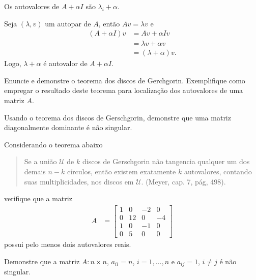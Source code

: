 \begin{questions}
    \question Os autovalores de $A + \alpha I$ s\~{a}o $\lambda_i + \alpha$.
    \begin{solution}
        Seja $(\lambda, v)$ um autopar de $A$, ent\~{a}o $A v = \lambda v$ e
        \begin{align*}
            (A + \alpha I) v &= A v + \alpha I v \\
            &= \lambda v + \alpha v \\
            &= (\lambda + \alpha)v.
        \end{align*}
        Logo, $\lambda + \alpha$ \'{e} autovalor de $A + \alpha I$.
    \end{solution}

    \question Enuncie e demonstre o teorema dos discos de Gerchgorin. Exemplifique como empregar o resultado deste teorema para localiza\c{c}\~{a}o dos autovalores de uma matriz $A$.
    \begin{solution}
    \end{solution}

    \question Usando o teorema dos discos de Gerschgorin, demonstre que uma matriz diagonalmente dominante \'{e} n\~{a}o singular.
    \begin{solution}
    \end{solution}

    \question Considerando o teorema abaixo
    \begin{quote}
        Se a uni\~{a}o $\mathcal{U}$ de $k$ discos de Gerschgorin n\~{a}o tangencia qualquer um dos demais $n - k$ c\'{i}rculos, ent\~{a}o existem exatamente $k$ autovalores, contando suas multiplicidades, nos discos em $\mathcal{U}$. (Meyer\nocite{Meyer:2000:matrix}, cap. 7, p\'{a}g, 498).
    \end{quote}
    verifique que a matriz
    \begin{align*}
        A &= \begin{bmatrix}
            1 & 0 & -2 & 0 \\
            0 & 12 & 0 & -4 \\
            1 & 0 & -1 & 0 \\
            0 & 5 & 0 & 0
        \end{bmatrix}
    \end{align*}
    possui pelo menos dois autovalores reais.
    \begin{solution}
    \end{solution}

    \question Demonstre que a matriz $A : n \times n$, $a_{ii} = n$, $i = 1, \ldots, n$ e $a_{ij} = 1$, $i \neq j$ \'{e} n\~{a}o singular.
    \begin{solution}
    \end{solution}
\end{questions}

